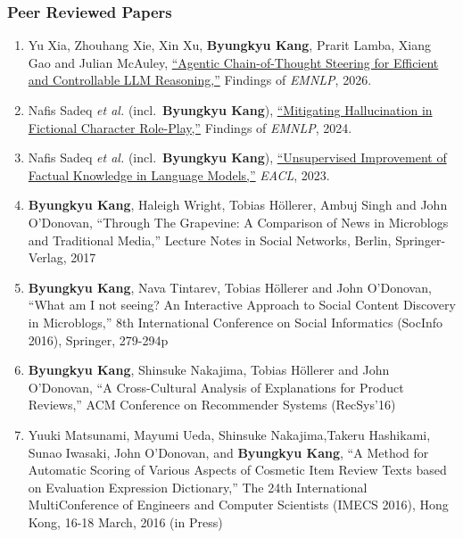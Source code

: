 \documentclass[10pt]{article}
\makeatletter
\newlength{\bibhang}
\newlength{\bibsep}
 {\@listi \global\bibsep\itemsep \global\advance\bibsep by\parsep}
\newenvironment{bibsection}%
        {\begin{enumerate}{}{%
       \setlength{\leftmargin}{\bibhang}%
       \setlength{\itemindent}{-\leftmargin}%
       \setlength{\itemsep}{\bibsep}%
       \setlength{\parsep}{\z@}%
        \setlength{\partopsep}{0pt}%
        \setlength{\topsep}{0pt}}}
        {\end{enumerate}\vspace{-.6\baselineskip}}
\makeatother
\begin{document}
\subsubsection*{Peer Reviewed Papers}
\begin{bibsection}
   \item[--] Yu Xia, Zhouhang Xie, Xin Xu, {\bf Byungkyu Kang}, Prarit Lamba, Xiang Gao and Julian McAuley, \href{https://arxiv.org/abs/2606.03965}{``Agentic Chain-of-Thought Steering for Efficient and Controllable LLM Reasoning,''} Findings of \emph{EMNLP}, 2026.

   \item[--] Nafis Sadeq \emph{et al.} (incl.\ {\bf Byungkyu Kang}), \href{https://aclanthology.org/2024.findings-emnlp.846/}{``Mitigating Hallucination in Fictional Character Role-Play,''} Findings of \emph{EMNLP}, 2024.

   \item[--] Nafis Sadeq \emph{et al.} (incl.\ {\bf Byungkyu Kang}), \href{https://aclanthology.org/2023.eacl-main.215/}{``Unsupervised Improvement of Factual Knowledge in Language Models,''} \emph{EACL}, 2023.

   \item[--] {\bf Byungkyu Kang}, Haleigh Wright, Tobias H\"ollerer, Ambuj Singh and John O'Donovan, ``Through The Grapevine: A Comparison of News in Microblogs and Traditional Media,'' Lecture Notes in Social Networks, Berlin, Springer-Verlag, 2017
   
   \item[--] {\bf Byungkyu Kang}, Nava Tintarev, Tobias H{\"o}llerer and John O'Donovan, ``What am I not seeing? An Interactive Approach to Social Content Discovery in Microblogs,'' 8th International Conference on Social Informatics (SocInfo 2016), Springer, 279-294p
   
   \item[--] {\bf Byungkyu Kang}, Shinsuke Nakajima, Tobias H{\"o}llerer and John O'Donovan, ``A Cross-Cultural Analysis of Explanations for Product Reviews,'' ACM Conference on Recommender Systems (RecSys'16)
   
   \item[--] Yuuki Matsunami, Mayumi Ueda, Shinsuke Nakajima,Takeru Hashikami, Sunao Iwasaki, John O'Donovan, and {\bf Byungkyu Kang}, ``A Method for Automatic Scoring of Various Aspects of Cosmetic Item Review Texts based on Evaluation Expression Dictionary,'' The 24th International MultiConference of Engineers and Computer Scientists (IMECS 2016), Hong Kong, 16-18 March, 2016 (in Press)
   

\end{bibsection}
\end{document}
